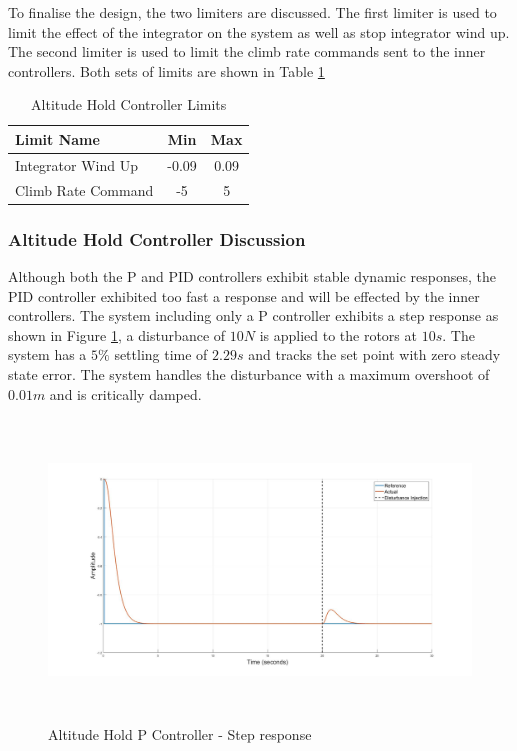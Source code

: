 	 To finalise the design, the two limiters are discussed. The first limiter is used to limit the effect of the integrator on the system as well as stop integrator wind up. The second limiter is used to limit the climb rate commands sent to the inner controllers. Both sets of limits are shown in Table \ref{tab:AltitudeControllerLimits}
	 
	 \begin{table}[!]
	 	\centering
	 	\begin{tabular}{l | c | c |}
	 		Limit Name 						& Min & Max\\
	 		\hline\hline
	 		Integrator Wind Up 				& -0.09 & 0.09 \\
	 		Climb Rate Command 		    	& -5 & 5 \\
	 	\end{tabular}
	 	\caption{Altitude Hold Controller Limits}
	 	\label{tab:AltitudeControllerLimits}
	 \end{table}
	 
	 \subsubsection{Altitude Hold Controller Discussion}
	 Although both the P and PID controllers exhibit stable dynamic responses, the PID controller exhibited too fast a response and will be effected by the inner controllers. The system including only a P controller exhibits a step response as shown in Figure \ref{IM_AltHoldStep}, a disturbance of $10N$ is applied to the rotors at $10s$. The system has a $5\%$ settling time of $2.29s$ and tracks the set point with zero steady state error. The system handles the disturbance with a maximum overshoot of $0.01m$ and is critically damped.
	 
	 \begin{figure}[H]
	 	\centering
	 	\includegraphics[height = 8cm]{../Design/Matlab/Controllers/altitude_step_p_no_dist.jpg}
	 	\caption{Altitude Hold P Controller -  Step response}
	 	\label{IM_AltHoldStep}
	 \end{figure}
	 

